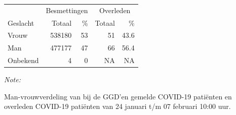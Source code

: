 \documentclass[
  english,
  man,floatsintext]{apa6}
\begin{document}
\begin{table}
\centering\begingroup\fontsize{11}{13}\selectfont

\begin{threeparttable}
\begin{tabular}{lrrrr}
\toprule
\multicolumn{1}{c}{ } & \multicolumn{2}{c}{Besmettingen} & \multicolumn{2}{c}{Overleden} \\
\cmidrule(l{3pt}r{3pt}){2-3} \cmidrule(l{3pt}r{3pt}){4-5}
Geslacht & Totaal & \% & Totaal & \%\\
\midrule
Vrouw & 538180 & 53 & 51 & 43.6\\
Man & 477177 & 47 & 66 & 56.4\\
Onbekend & 4 & 0 & NA & NA\\
\bottomrule
\end{tabular}
\begin{tablenotes}
\item \textit{Note: } 
\item Man-vrouwverdeling van bij de GGD’en gemelde COVID-19 patiënten en overleden COVID-19 patiënten van 24 januari t/m 07 februari 10:00 uur.
\end{tablenotes}
\end{threeparttable}
\endgroup{}
\end{table}
\newpage
\end{document}
